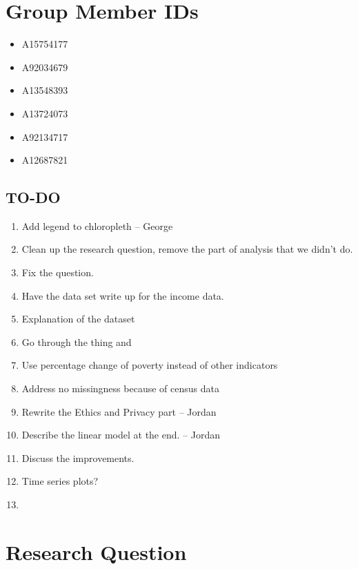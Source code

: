\documentclass[11pt]{article}
\providecommand{\tightlist}{%
      \setlength{\itemsep}{0pt}\setlength{\parskip}{0pt}}
\begin{document}
    \hypertarget{group-member-ids}{%
\section{Group Member IDs}\label{group-member-ids}}

\begin{itemize}
\tightlist
\item
  A15754177
\item
  A92034679
\item
  A13548393
\item
  A13724073
\item
  A92134717
\item
  A12687821
\end{itemize}

    \hypertarget{to-do}{%
\subsection{TO-DO}\label{to-do}}

\begin{enumerate}
\def\labelenumi{\arabic{enumi}.}
\item
  Add legend to chloropleth -- George
\item
  Clean up the research question, remove the part of analysis that we
  didn't do.
\item
  Fix the question.
\item
  Have the data set write up for the income data.
\item
  Explanation of the dataset
\item
  Go through the thing and
\item
  Use percentage change of poverty instead of other indicators
\item
  Address no missingness because of census data
\item
  Rewrite the Ethics and Privacy part -- Jordan
\item
  Describe the linear model at the end. -- Jordan
\item
  Discuss the improvements.
\item
  Time series plots?
\item
\end{enumerate}

    \hypertarget{research-question}{%
\section{Research Question}\label{research-question}}
\end{document}
